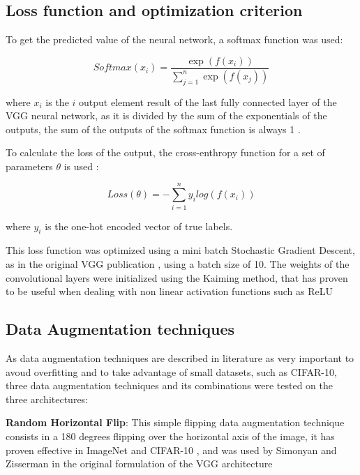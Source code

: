 \documentclass[10pt,twocolumn,letterpaper]{article}
\begin{document}
\subsection{Loss function and optimization criterion}

To get the predicted value of the neural network, a softmax function was used:

\begin{equation}
	{Softmax}(x_{i}) = \frac{\exp(f(x_i))}{\sum_{j=1}^{n} \exp(f(x_j))}
\end{equation}

where $x_i$ is the $i$  output element result of the last fully connected layer of the VGG neural network, as it is divided by the sum of the exponentials of the outputs, the sum of the outputs of the softmax function is always 1 \cite{Skansi2018}.

To calculate the loss of the output, the cross-enthropy function for a set of parameters $\theta$ is used \cite{Hastie2009}:

\begin{equation}
	{Loss}(\theta) = - \sum_{i=1}^{n} y_i log(f(x_i))
\end{equation}

where $y_i$ is the one-hot encoded vector of true labels. 

This loss function was optimized using a mini batch Stochastic Gradient Descent, as in the original VGG publication \cite{Simonyan2015}, using a batch size of 10. The weights of the convolutional layers were initialized using the Kaiming method, that has proven to be useful when dealing with non linear activation functions such as ReLU \cite{He2015}

\subsection{Data Augmentation techniques}

As data augmentation techniques are described in literature as very important to avoud overfitting and to take advantage of small datasets\cite{Shorten2019}, such as CIFAR-10, three data augmentation techniques and its combinations were tested on the three architectures:

\textbf{Random Horizontal Flip}: This simple flipping data augmentation technique consists in a 180 degrees flipping over the horizontal axis of the image, it has proven effective in ImageNet and CIFAR-10 \cite{Shorten2019}, and was used by Simonyan and Zisserman \cite{Simonyan2015} in the original formulation of the VGG architecture
\end{document}
